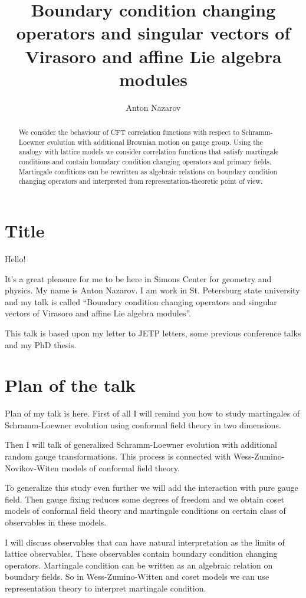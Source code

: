 \documentclass[a4paper]{article}
\title{Boundary condition changing operators and singular vectors of Virasoro and
affine Lie algebra modules}
\author{Anton Nazarov}
\begin{document}
\maketitle
\begin{abstract}
We consider the behaviour of CFT correlation functions with respect to
Schramm-Loewner evolution with additional Brownian motion on gauge
group. Using the analogy with lattice models we consider
correlation functions that satisfy martingale conditions and contain
boundary condition changing operators and primary fields.
Martingale conditions can be rewritten as algebraic relations on
boundary condition changing operators and interpreted from
representation-theoretic point of view.
\end{abstract}

\section{Title}
\label{sec:title}

Hello! 

It's a great pleasure for me to be here in Simons Center for geometry and physics. My name is Anton
Nazarov. I am work in St. Petersburg state university and my talk is called ``Boundary condition
changing operators and singular vectors of Virasoro and affine Lie algebra modules''.

This talk is based upon my letter to JETP letters, some previous conference talks and my PhD thesis. 

\section{Plan of the talk}
\label{sec:plan-talk}

Plan of my talk is here. First of all I will remind you how to study martingales of Schramm-Loewner
evolution using conformal field theory in two dimensions. 

Then I will talk of generalized Schramm-Loewner evolution with additional random gauge
transformations. This process is connected with Wess-Zumino-Novikov-Witen models of conformal field
theory. 

To generalize this study even further we will add the interaction with pure gauge field. Then gauge
fixing reduces some degrees of freedom and we obtain coset models of conformal field theory and
martingale conditions on certain class of observables in these models. 

I will discuss observables that can have natural interpretation as the limits of lattice
observables. These observables contain boundary condition changing operators. Martingale condition
can be written as an algebraic relation on boundary fields. So in Wess-Zumino-Witten and coset models
we can use representation theory to interpret martingale condition. 
\end{document}
